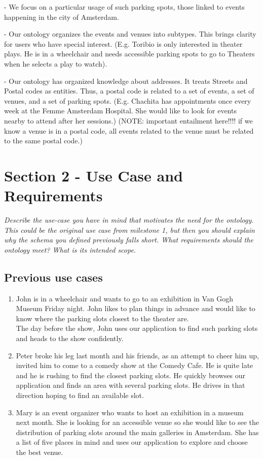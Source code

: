 \documentclass[runningheads,a4paper]{../../StyleFiles/llncs}
\begin{document}
- We focus on a particular usage of such parking spots, those linked to events happening in the city of Amsterdam. 

- Our ontology organizes the events and venues into subtypes. This brings clarity for users who have special interest. (E.g. Toribio is only interested in theater plays. He is in a wheelchair and needs accessible parking spots to go to Theaters when he selects a play to watch).

- Our ontology has organized knowledge about addresses. It treats Streets and Postal codes as entities. Thus, a postal code is related to a set of events, a set of venues, and a set of parking spots. (E.g. Chachita has appointments once every week at the Femme Amsterdam Hospital. She would like to look for events nearby to attend after her sessions.)
(NOTE: important entailment here!!!! if we know a venue is in a postal code, all events related to the venue must be related to the same postal code.)


\section{Section 2 - Use Case and Requirements}
\textit{Describe the use-case you have in mind that motivates the need for the ontology. This could be the original use case from milestone 1, but then you should explain why the schema you defined previously falls short. What requirements should the ontology meet? What is its intended scope.}
\subsection{Previous use cases}
\begin{enumerate}
	\item John is in a wheelchair and wants to go to an exhibition in Van Gogh Museum Friday night. John likes to plan things in advance and would like to know where the parking slots closest to the theater are. \\
	The day before the show, John uses our application to find such parking slots and heads to the show confidently. 
	\item Peter broke his leg last month and his friends, as an attempt to cheer him up, invited him to come to a comedy show at the Comedy Cafe. He is quite late and he is rushing to find the closest parking slots. He quickly browses our application and finds an area with several parking slots. He drives in that direction hoping to find an available slot. 
	\item Mary is an event organizer who wants to host an exhibition in a museum next month. She is looking for an accessible venue so she would like to see the distribution of parking slots around the main galleries in Amsterdam. She has a list of five places in mind and uses our application to explore and choose the best venue.
\end{enumerate}
\end{document}
